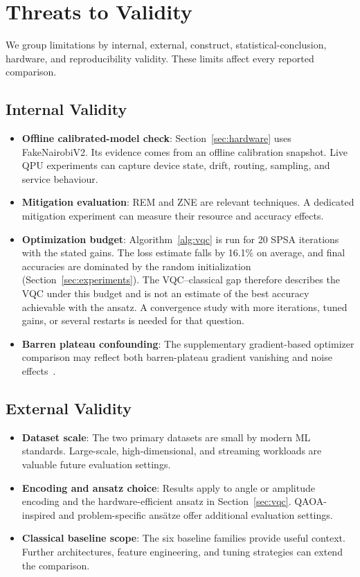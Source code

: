 \documentclass[final,5p,times,number]{elsarticle}
\begin{document}
\section{Threats to Validity}
\label{sec:threats}

We group limitations by internal, external, construct, statistical-conclusion, hardware, and reproducibility validity. These limits affect every reported comparison.

\subsection{Internal Validity}
\begin{itemize}[leftmargin=*]
  \item \textbf{Offline calibrated-model check}: Section~\ref{sec:hardware} uses FakeNairobiV2. Its evidence comes from an offline calibration snapshot. Live QPU experiments can capture device state, drift, routing, sampling, and service behaviour.
  \item \textbf{Mitigation evaluation}: REM and ZNE are relevant techniques. A dedicated mitigation experiment can measure their resource and accuracy effects.
  \item \textbf{Optimization budget}: Algorithm~\ref{alg:vqc} is run for 20 SPSA iterations with the stated gains. The loss estimate falls by 16.1\% on average, and final accuracies are dominated by the random initialization (Section~\ref{sec:experiments}). The VQC--classical gap therefore describes the VQC under this budget and is not an estimate of the best accuracy achievable with the ansatz. A convergence study with more iterations, tuned gains, or several restarts is needed for that question.
  \item \textbf{Barren plateau confounding}: The supplementary gradient-based optimizer comparison may reflect both barren-plateau gradient vanishing and noise effects~\cite{mcclean2018barren,wang2021noise_barren}.
\end{itemize}

\subsection{External Validity}
\begin{itemize}[leftmargin=*]
  \item \textbf{Dataset scale}: The two primary datasets are small by modern ML standards. Large-scale, high-dimensional, and streaming workloads are valuable future evaluation settings.
  \item \textbf{Encoding and ansatz choice}: Results apply to angle or amplitude encoding and the hardware-efficient ansatz in Section~\ref{sec:vqc}. QAOA-inspired and problem-specific ansätze offer additional evaluation settings.
  \item \textbf{Classical baseline scope}: The six baseline families provide useful context. Further architectures, feature engineering, and tuning strategies can extend the comparison.
\end{itemize}
\end{document}
